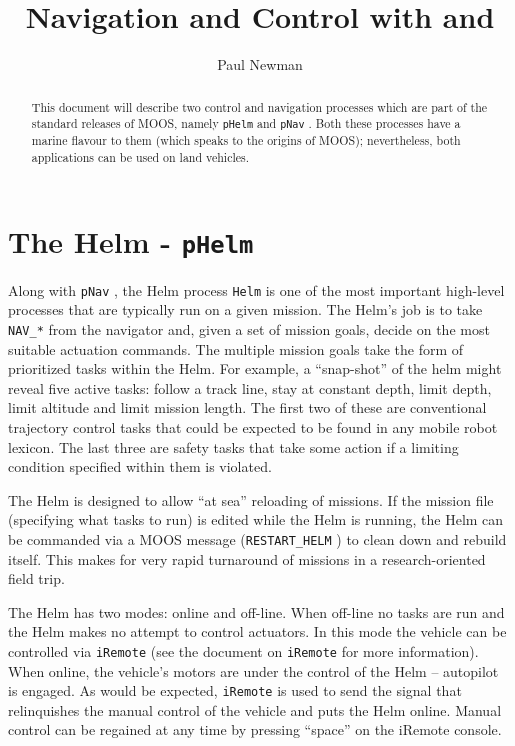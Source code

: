 \documentclass[a4paper,10pt]{article}
\title{Navigation and Control with \code{pNav} and \code{pHelm}}
\author{Paul Newman}
\newcommand{\Code}[1]{\texttt{#1} }
\newcommand{\code}[1]{\Code{#1} }
\begin{document}
\maketitle

\begin{center}
\end{center}
\begin{abstract}
This document will  describe two  control and navigation processes which are part of the standard
releases of MOOS, namely \code{pHelm} and \code{pNav}. Both these processes have a marine flavour to them (which speaks to the origins of MOOS); nevertheless, both applications can be used on land vehicles.
\end{abstract}

\section{ The Helm - \code{pHelm}}
Along with \code{pNav}, the Helm process \code{Helm} is one of the
most important high-level processes that are typically run on a
given mission. The Helm's job is to take \code{NAV\_*} from the
navigator and, given a set of mission goals, decide on the most
suitable actuation commands. The multiple mission goals take the
form of prioritized tasks within the Helm. For example, a
``snap-shot'' of the helm might reveal five active tasks: follow a
track line, stay at constant depth, limit depth, limit altitude
and limit mission length. The first two of these are conventional
trajectory control tasks that could be expected to be found in any
mobile robot lexicon. The last three are safety tasks that
take some action if a limiting condition specified within them is
violated.

The Helm is designed to allow ``at sea'' reloading of missions. If
the mission file (specifying what tasks to run) is edited while
the Helm is running, the Helm can be commanded via a MOOS message
(\code{RESTART\_HELM}) to clean down and rebuild itself. This
makes for very rapid turnaround of missions in a research-oriented
field trip.

The Helm has two modes: online and off-line. When off-line no
tasks are run and the Helm makes no attempt to control actuators.
In this mode the vehicle can be controlled via \code{iRemote} (see
the document on \code{iRemote} for more information). When online, the vehicle's motors are under the
control of the Helm -- autopilot is engaged. As would be expected,
\code{iRemote} is used to send the signal that relinquishes the
manual control of the vehicle and puts the Helm online. Manual
control can be regained at any time by pressing ``space'' on the
iRemote console.
\end{document}
